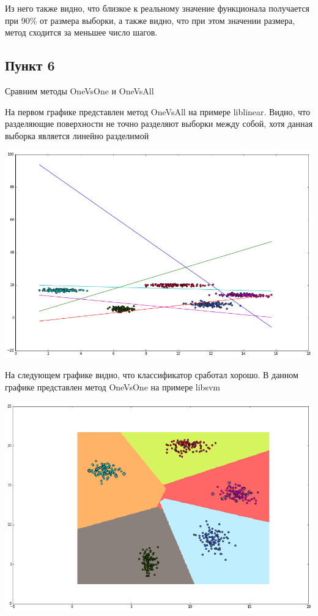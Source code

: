 \documentclass[12pt, a4paper]{article}
\begin{document}
			Из него также видно, что близкое к реальному значение функционала получается при 90\% от размера выборки, а также видно, что при этом значении размера, метод сходится за меньшее число шагов.

		\newpage
		\subsection{Пункт 6}
			Сравним методы OneVsOne и OneVsAll

			На первом графике представлен метод OneVsAll на примере liblinear. Видно, что разделяющие поверхности не точно разделяют выборки между собой, хотя данная выборка является линейно разделимой
			\begin{center}
				\includegraphics[width=15cm]{6par.png}
			\end{center}

			На следующем графике видно, что классификатор сработал хорошо. В данном графике представлен метод OneVsOne на примере libsvm
			\begin{center}
				\includegraphics[width=15cm]{6par_dual.png}
			\end{center}
\end{document}
